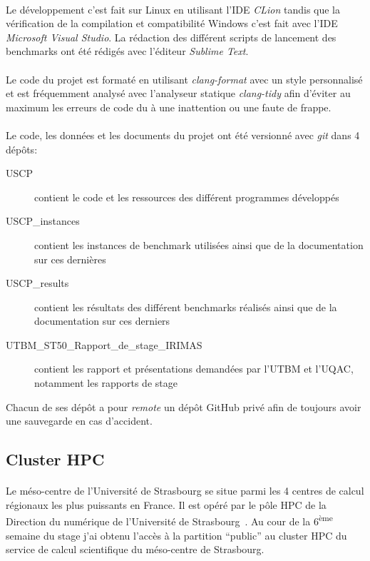 \documentclass[a4paper,11pt,twoside,french,report]{../common/simplem}
\begin{document}
				\paragraph*{}
					Le développement c'est fait sur Linux en utilisant l'\gls{IDE} \textit{CLion} tandis que la vérification de la compilation et compatibilité Windows c'est fait avec l'\gls{IDE} \textit{Microsoft Visual Studio}. La rédaction des différent scripts de lancement des benchmarks ont été rédigés avec l'éditeur \textit{Sublime Text}.
				\paragraph*{}
					Le code du projet est formaté en utilisant \textit{clang-format} avec un style personnalisé et est fréquemment analysé avec l'analyseur statique \textit{clang-tidy} afin d'éviter au maximum les erreurs de code du à une inattention ou une faute de frappe.
				\paragraph*{}
					Le code, les données et les documents du projet ont été versionné avec \textit{git} dans 4 dépôts:
					\begin{description}
						\item[USCP] contient le code et les ressources des différent programmes développés
						\item[USCP\_instances] contient les instances de benchmark utilisées ainsi que de la documentation sur ces dernières
						\item[USCP\_results] contient les résultats des différent benchmarks réalisés ainsi que de la documentation sur ces derniers
						\item[UTBM\_ST50\_Rapport\_de\_stage\_IRIMAS] contient les rapport et présentations demandées par l'\gls{UTBM} et l'\gls{UQAC}, notamment les rapports de stage
					\end{description}
					Chacun de ses dépôt a pour \textit{remote} un dépôt GitHub privé afin de toujours avoir une sauvegarde en cas d'accident.
			\subsection{Cluster \acrshort{HPC}}
				\paragraph*{}
					Le méso-centre de l'Université de Strasbourg se situe parmi les 4 centres de calcul régionaux les plus puissants en France. Il est opéré par le pôle \gls{HPC} de la Direction du numérique de l’Université de Strasbourg~\cite{UNISTRA_Calcul_scientifique}. Au cour de la 6\textsuperscript{ème} semaine du stage j'ai obtenu l’accès à la partition ``public'' au cluster \gls{HPC} du service de calcul scientifique du méso-centre de Strasbourg.
\end{document}
